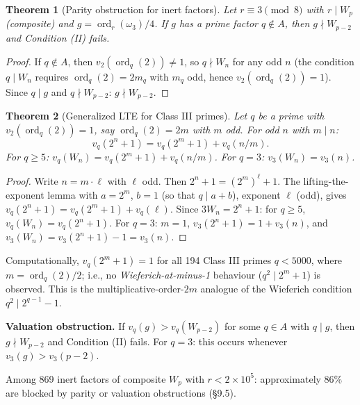 \documentclass[12pt]{article}
\theoremstyle{plain}
\newtheorem{theorem}{Theorem}[section]
\theoremstyle{definition}
\theoremstyle{remark}
\begin{document}
\begin{theorem}[Parity obstruction for inert factors]\label{thm:parity-obstruction}
Let
\(r \equiv 3 \pmod{8}\) with \(r \mid W_p\) (composite) and
\(g = \operatorname{ord}_r(\omega_3)/4\). If \(g\) has a prime factor
\(q \notin A\), then \(g \nmid W_{p-2}\) and Condition (II) fails.
\end{theorem}


\begin{proof}
If \(q \notin A\), then \(v_2(\operatorname{ord}_q(2)) \neq 1\),
so \(q \nmid W_n\) for any odd \(n\) (the condition \(q \mid W_n\)
requires \(\operatorname{ord}_q(2) = 2m_q\) with \(m_q\) odd, hence
\(v_2(\operatorname{ord}_q(2)) = 1\)). Since \(q \mid g\) and
\(q \nmid W_{p-2}\): \(g \nmid W_{p-2}\).\end{proof}


\begin{theorem}[Generalized LTE for Class III primes]\label{thm:generalized-LTE}
Let
\(q\) be a prime with \(v_2(\operatorname{ord}_q(2)) = 1\), say
\(\operatorname{ord}_q(2) = 2m\) with \(m\) odd. For odd \(n\)
with \(m \mid n\):
\[
v_q(2^n + 1) = v_q(2^m + 1) + v_q(n/m).
\]
For \(q \geq 5\): \(v_q(W_n) = v_q(2^m + 1) + v_q(n/m)\).
For \(q = 3\): \(v_3(W_n) = v_3(n)\).
\end{theorem}


\begin{proof}
Write \(n = m \cdot \ell\) with \(\ell\) odd. Then
\(2^n + 1 = (2^m)^\ell + 1\). The lifting-the-exponent lemma
with \(a = 2^m\), \(b = 1\) (so that \(q \mid a + b\)),
exponent \(\ell\) (odd), gives
\(v_q(2^n + 1) = v_q(2^m + 1) + v_q(\ell)\).
Since \(3W_n = 2^n + 1\): for \(q \geq 5\),
\(v_q(W_n) = v_q(2^n + 1)\). For \(q = 3\): \(m = 1\),
\(v_3(2^n+1) = 1 + v_3(n)\), and
\(v_3(W_n) = v_3(2^n+1) - 1 = v_3(n)\).\end{proof}


Computationally, \(v_q(2^m + 1) = 1\) for all 194 Class III primes
\(q < 5000\), where \(m = \operatorname{ord}_q(2)/2\); i.e., no
\emph{Wieferich-at-minus-1} behaviour (\(q^2 \mid 2^m + 1\)) is observed.
This is the multiplicative-order-\(2m\) analogue of the Wieferich
condition \(q^2 \mid 2^{q-1} - 1\).

\textbf{Valuation obstruction.} If \(v_q(g) > v_q(W_{p-2})\) for some
\(q \in A\) with \(q \mid g\), then \(g \nmid W_{p-2}\) and
Condition (II) fails. For \(q = 3\): this occurs whenever
\(v_3(g) > v_3(p-2)\).

Among 869 inert factors of composite \(W_p\) with \(r < 2 \times 10^5\):
approximately 86\% are blocked by parity or valuation obstructions
(\S9.5).
\end{document}
